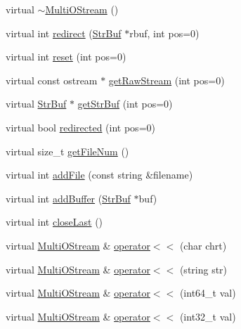 \begin{DoxyCompactItemize}
virtual \hyperlink{classHSF_1_1MultiOStream_ae743ac2c5f62bb631f10e0efdf45c0a5}{$\sim$MultiOStream} ()
\item 
virtual int \hyperlink{classHSF_1_1MultiOStream_a5b4339f2eafeae22419e413625b94216}{redirect} (\hyperlink{namespaceHSF_a099dd77b4cb045fbbd0fb0dd0946e198}{StrBuf} $\ast$rbuf, int pos=0)
\item 
virtual int \hyperlink{classHSF_1_1MultiOStream_aa9292b98a3ef97388d1aa6ce8119412f}{reset} (int pos=0)
\item 
virtual const ostream $\ast$ \hyperlink{classHSF_1_1MultiOStream_afb114bb87da89f7ea7ac65af6ffc65f2}{getRawStream} (int pos=0)
\item 
virtual \hyperlink{namespaceHSF_a099dd77b4cb045fbbd0fb0dd0946e198}{StrBuf} $\ast$ \hyperlink{classHSF_1_1MultiOStream_a2a33520e221422d2a10e1c3eace3029b}{getStrBuf} (int pos=0)
\item 
virtual bool \hyperlink{classHSF_1_1MultiOStream_a4f08ea78abbcd60f0d6460cdce6ea79d}{redirected} (int pos=0)
\item 
virtual size\_\-t \hyperlink{classHSF_1_1MultiOStream_ac0ac202ca73eb0c39d4b4b3f8f462f34}{getFileNum} ()
\item 
virtual int \hyperlink{classHSF_1_1MultiOStream_ad43365fb905b031fcbe0e9618daf8d28}{addFile} (const string \&filename)
\item 
virtual int \hyperlink{classHSF_1_1MultiOStream_a0fea8b810751922bf4b67b814b31b737}{addBuffer} (\hyperlink{namespaceHSF_a099dd77b4cb045fbbd0fb0dd0946e198}{StrBuf} $\ast$buf)
\item 
virtual int \hyperlink{classHSF_1_1MultiOStream_a60ad324c113b00270b59a9745e08a0c1}{closeLast} ()
\item 
virtual \hyperlink{classHSF_1_1MultiOStream}{MultiOStream} \& \hyperlink{classHSF_1_1MultiOStream_a5539fcb94f7ab127f5d41768f18c59d0}{operator$<$$<$} (char chrt)
\item 
virtual \hyperlink{classHSF_1_1MultiOStream}{MultiOStream} \& \hyperlink{classHSF_1_1MultiOStream_ab928595ef99d77f13d961541cb2e9f78}{operator$<$$<$} (string str)
\item 
virtual \hyperlink{classHSF_1_1MultiOStream}{MultiOStream} \& \hyperlink{classHSF_1_1MultiOStream_a960936ac105e7f2ed4801f0725dedfba}{operator$<$$<$} (int64\_\-t val)
\item 
virtual \hyperlink{classHSF_1_1MultiOStream}{MultiOStream} \& \hyperlink{classHSF_1_1MultiOStream_a83208fee91d9117cf7411cd63477c9fe}{operator$<$$<$} (int32\_\-t val)
\item 

\end{DoxyCompactItemize}
